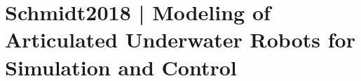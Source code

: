 \section{Schmidt2018 | Modeling of Articulated Underwater Robots for Simulation and Control}

\cite{schmidt2018} 
